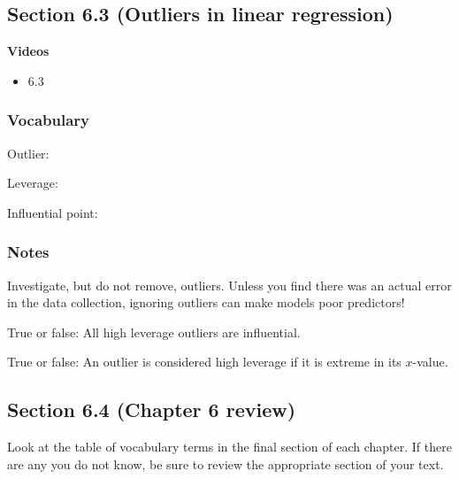 \documentclass[
]{report}
\providecommand{\tightlist}{%
  \setlength{\itemsep}{0pt}\setlength{\parskip}{0pt}}
\newcommand{\rgs}{\vspace{12pt}} %
\begin{document}
\hypertarget{section-6.3-outliers-in-linear-regression}{%
\subsection*{Section 6.3 (Outliers in linear regression)}\label{section-6.3-outliers-in-linear-regression}}


\textbf{Videos}

\begin{itemize}
\tightlist
\item
  6.3
\end{itemize}


\hypertarget{vocabulary-7}{%
\subsubsection*{Vocabulary}\label{vocabulary-7}}

Outlier:
\rgs

Leverage:
\rgs

Influential point:
\rgs

\hypertarget{notes-9}{%
\subsubsection*{Notes}\label{notes-9}}

Investigate, but do not remove, outliers. Unless you find there was an actual error in the data collection, ignoring outliers can make models poor predictors!

True or false: All high leverage outliers are influential.

True or false: An outlier is considered high leverage if it is extreme in its \(x\)-value.

\hypertarget{section-6.4-chapter-6-review}{%
\subsection*{Section 6.4 (Chapter 6 review)}\label{section-6.4-chapter-6-review}}


Look at the table of vocabulary terms in the final section of each chapter. If there are any you do not know, be sure to review the appropriate section of your text.
\end{document}
